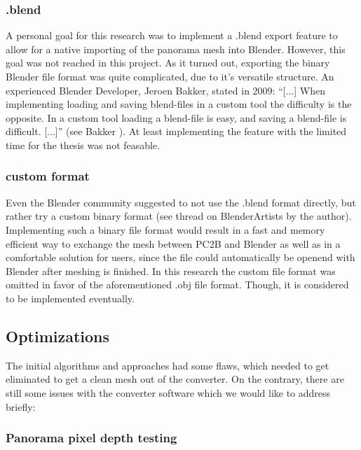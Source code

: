 \subsubsection{.blend}

A personal goal for this research was to implement a .blend export feature to allow for a native importing of the panorama mesh into Blender. However, this goal was not reached in this project. As it turned out, exporting the binary Blender file format was quite complicated, due to it's versatile structure. An experienced Blender Developer, Jeroen Bakker, stated in 2009: “[...] When implementing loading and saving blend-files in a custom tool the difficulty is the opposite. In a custom tool loading a blend-file is easy, and saving a blend-file is difficult. [...]” (see Bakker \parencite{webMysteryOfTheBlend}). At least implementing the feature with the limited time for the thesis was not feasable.

\subsubsection{custom format}

Even the Blender community suggested to not use the .blend format directly, but rather try a custom binary format (see thread on BlenderArtists \parencite{webBlenderArtistsBlendExport} by the author). Implementing such a binary file format would result in a fast and memory efficient way to exchange the mesh between PC2B and Blender as well as in a comfortable solution for users, since the file could automatically be openend with Blender after meshing is finished. In this research the custom file format was omitted in favor of the aforementioned .obj file format. Though, it is considered to be implemented eventually.

\subsection{Optimizations}

The initial algorithms and approaches had some flaws, which needed to get eliminated to get a clean mesh out of the converter. On the contrary, there are still some issues with the converter software which we would like to address briefly:

\subsubsection{Panorama pixel depth testing}

